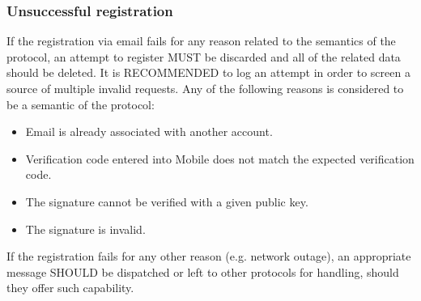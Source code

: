             \subsubsection{Unsuccessful registration}
            If the registration via email fails for any reason related to the semantics of the protocol, an attempt to
            register MUST be discarded and all of the related data should be deleted. It is RECOMMENDED to log an attempt
            in order to screen a source of multiple invalid requests. Any of the following reasons is considered to be
            a semantic of the protocol:
            \begin{itemize}
                  \item Email is already associated with another account.
                  \item Verification code entered into Mobile does not match the expected verification code.
                  \item The signature cannot be verified with a given public key.
                  \item The signature is invalid.
            \end{itemize}
            If the registration fails for any other reason (e.g. network outage), an appropriate message SHOULD be
            dispatched or left to other protocols for handling, should they offer such capability.
